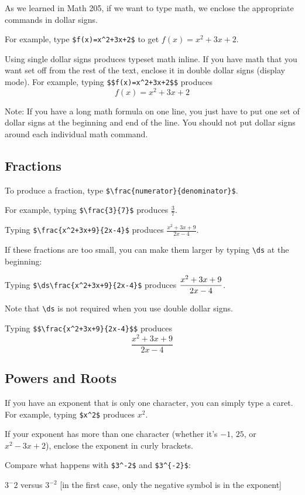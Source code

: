 \documentclass[12pt]{article}
\begin{document}
As we learned in Math 205, if we want to type math, we enclose the appropriate commands in dollar signs.

For example, type \verb|$f(x)=x^2+3x+2$| to get $f(x)=x^2+3x+2$.

Using single dollar signs produces typeset math inline. If you have math that you want set off from the rest of the text, enclose it in double dollar signs (display mode). For example, typing \verb|$$f(x)=x^2+3x+2$$| produces $$f(x)=x^2+3x+2$$

Note: If you have a long math formula on one line, you just have to put one set of dollar signs at the beginning and end of the line. You should not put dollar signs around each individual math command.

\subsection{Fractions}

To produce a fraction, type \verb|$\frac{numerator}{denominator}$|.

For example, typing \verb|$\frac{3}{7}$| produces $\frac{3}{7}$.

Typing \verb|$\frac{x^2+3x+9}{2x-4}$| produces $\frac{x^2+3x+9}{2x-4}$.

If these fractions are too small, you can make them larger by typing \verb|\ds| at the beginning:

Typing \verb|$\ds\frac{x^2+3x+9}{2x-4}$| produces $\displaystyle\frac{x^2+3x+9}{2x-4}$.

Note that \verb|\ds| is not required when you use double dollar signs.

Typing \verb|$$\frac{x^2+3x+9}{2x-4}$$| produces $$\frac{x^2+3x+9}{2x-4}$$

\subsection{Powers and Roots}

If you have an exponent that is only one character, you can simply type a caret. For example, typing \verb|$x^2$| produces $x^2$.

If your exponent has more than one character (whether it's $-1$, $25$, or $x^2-3x+2$), enclose the exponent in curly brackets.

Compare what happens with \verb|$3^-2$| and \verb|$3^{-2}$|:

$3^-2$ versus $3^{-2}$ [in the first case, only the negative symbol is in the exponent]
\end{document}
